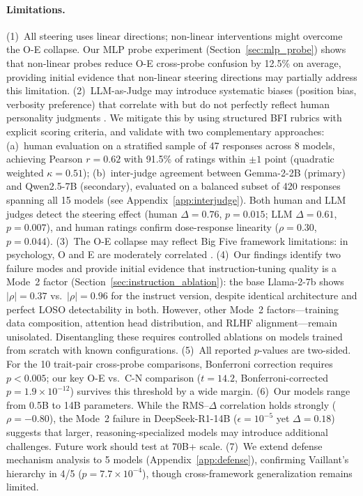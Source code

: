 \documentclass{article}
\begin{document}
\paragraph{Limitations.}
(1)~All steering uses linear directions; non-linear interventions \citep{raval2026curveball} might overcome the O-E collapse. Our MLP probe experiment (Section~\ref{sec:mlp_probe}) shows that non-linear probes reduce O-E cross-probe confusion by 12.5\% on average, providing initial evidence that non-linear steering directions may partially address this limitation. (2)~LLM-as-Judge may introduce systematic biases (position bias, verbosity preference) that correlate with but do not perfectly reflect human personality judgments \citep{zheng2023judging}. We mitigate this by using structured BFI rubrics with explicit scoring criteria, and validate with two complementary approaches: (a)~human evaluation on a stratified sample of 47 responses across 8 models, achieving Pearson $r{=}0.62$ with 91.5\% of ratings within $\pm1$ point (quadratic weighted $\kappa{=}0.51$); (b)~inter-judge agreement between Gemma-2-2B (primary) and Qwen2.5-7B (secondary), evaluated on a balanced subset of 420 responses spanning all 15 models (see Appendix~\ref{app:interjudge}). Both human and LLM judges detect the steering effect (human $\Delta{=}0.76$, $p{=}0.015$; LLM $\Delta{=}0.61$, $p{=}0.007$), and human ratings confirm dose-response linearity ($\rho{=}0.30$, $p{=}0.044$). (3)~The O-E collapse may reflect Big Five framework limitations: in psychology, O and E are moderately correlated \citep{costa1992revised}. (4)~Our findings identify two failure modes and provide initial evidence that instruction-tuning quality is a Mode~2 factor (Section~\ref{sec:instruction_ablation}): the base Llama-2-7b shows $|\rho|{=}0.37$ vs.\ $|\rho|{=}0.96$ for the instruct version, despite identical architecture and perfect LOSO detectability in both. However, other Mode~2 factors---training data composition, attention head distribution, and RLHF alignment---remain unisolated. Disentangling these requires controlled ablations on models trained from scratch with known configurations. (5)~All reported $p$-values are two-sided. For the 10 trait-pair cross-probe comparisons, Bonferroni correction requires $p{<}0.005$; our key O-E vs.\ C-N comparison ($t{=}14.2$, Bonferroni-corrected $p{=}1.9{\times}10^{-12}$) survives this threshold by a wide margin. (6)~Our models range from 0.5B to 14B parameters. While the RMS--$\Delta$ correlation holds strongly ($\rho{=}{-}0.80$), the Mode~2 failure in DeepSeek-R1-14B ($\epsilon{=}10^{-5}$ yet $\Delta{=}0.18$) suggests that larger, reasoning-specialized models may introduce additional challenges. Future work should test at 70B+ scale. (7)~We extend defense mechanism analysis to 5 models (Appendix~\ref{app:defense}), confirming Vaillant's hierarchy in 4/5 ($p{=}7.7{\times}10^{-4}$), though cross-framework generalization remains limited.
\end{document}
